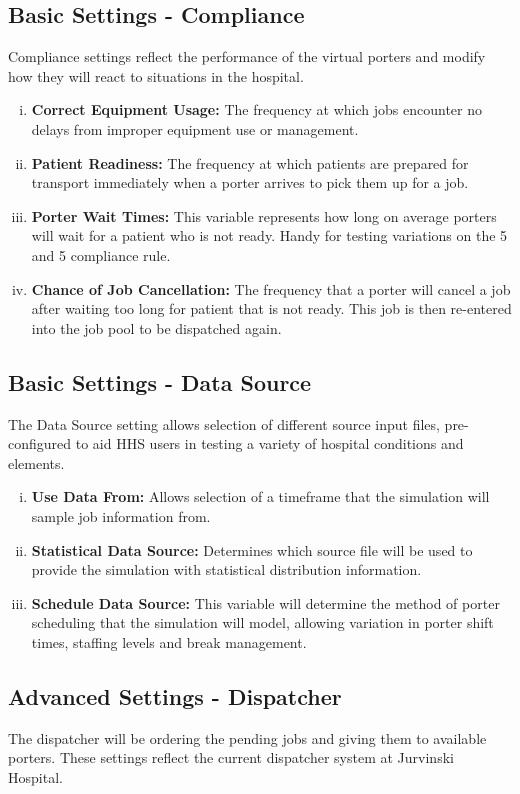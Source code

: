 \documentclass[paper=letter, fontsize=10pt]{scrartcl}
\numberwithin{equation}{section}		%
\numberwithin{figure}{section}			%
\numberwithin{table}{section}				%
\begin{document}
	\subsection{Basic Settings - Compliance}
	Compliance settings reflect the performance of the virtual porters and modify how they will react to situations in the hospital.
	\begin{enumerate}[(i)]
		\item \textbf{Correct Equipment Usage:} The frequency at which jobs encounter no delays from improper equipment use or management.
		\item \textbf{Patient Readiness:} The frequency at which patients are prepared for transport immediately when a porter arrives to pick them up for a job.
		\item \textbf{Porter Wait Times:} This variable represents how long on average porters will wait for a patient who is not ready. Handy for testing variations on the 5 and 5 compliance rule.
		\item \textbf{Chance of Job Cancellation:} The frequency that a porter will cancel a job after waiting too long for patient that is not ready. This job is then re-entered into the job pool to be dispatched again.
	\end{enumerate}
	
	\subsection{Basic Settings - Data Source}
	The Data Source setting allows selection of different source input files, pre-configured to aid HHS users in testing a variety of hospital conditions and elements. 
	\begin{enumerate}[(i)]
		\item \textbf{Use Data From:} Allows selection of a timeframe that the simulation will sample job information from.
		\item \textbf{Statistical Data Source:} Determines which source file will be used to provide the simulation with statistical distribution information. 
		\item \textbf{Schedule Data Source:} This variable will determine the method of porter scheduling that the simulation will model, allowing variation in porter shift times, staffing levels and break management.
	\end{enumerate}
	
	\subsection{Advanced Settings - Dispatcher}
	The dispatcher will be ordering the pending jobs and giving them to available porters.  These settings reflect the current dispatcher system at Jurvinski Hospital.
	
\end{document}
